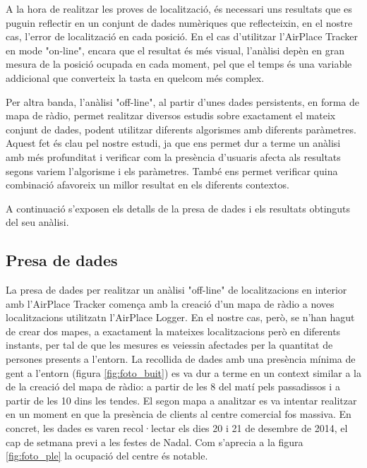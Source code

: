 
A la hora de realitzar les proves de localització, és necessari uns resultats que es puguin reflectir en un conjunt de dades numèriques que reflecteixin, en el nostre cas, l'error de localització en cada posició. En el cas d'utilitzar l'AirPlace Tracker en mode "on-line", encara que el resultat és més visual, l'anàlisi depèn en gran mesura de la posició ocupada en cada moment, pel que el temps és una variable addicional que converteix la tasta en quelcom més complex.

Per altra banda, l'anàlisi "off-line", al partir d'unes dades persistents, en forma de mapa de ràdio, permet realitzar diversos estudis sobre exactament el mateix conjunt de dades, podent utilitzar diferents algorismes amb diferents paràmetres. Aquest fet és clau pel nostre estudi, ja que ens permet dur a terme un anàlisi amb més profunditat i verificar com la presència d'usuaris afecta als resultats segons variem l'algorisme i els paràmetres. També ens permet verificar quina combinació afavoreix un millor resultat en els diferents contextos.

A continuació s'exposen els detalls de la presa de dades i els resultats obtinguts del seu anàlisi.

\subsection{Presa de dades}

La presa de dades per realitzar un anàlisi "off-line" de localitzacions en interior amb l'AirPlace Tracker comença amb la creació d'un mapa de ràdio a noves localitzacions utilitzatn l'AirPlace Logger. En el nostre cas, però, se n'han hagut de crear dos mapes, a exactament la mateixes localitzacions però en diferents instants, per tal de que les mesures es veiessin afectades per la quantitat de persones presents a l'entorn. La recollida de dades amb una presència mínima de gent a l'entorn (figura \ref{fig:foto_buit}) es va dur a terme en un context similar a la de la creació del mapa de ràdio: a partir de les 8 del matí pels passadissos i a partir de les 10 dins les tendes. El segon mapa a analitzar es va intentar realitzar en un moment en que la presència de clients al centre comercial fos massiva. En concret, les dades es varen recol·lectar els dies 20 i 21 de desembre de 2014, el cap de setmana previ a les festes de Nadal. Com s'aprecia a la figura \ref{fig:foto_ple} la ocupació del centre és notable.

